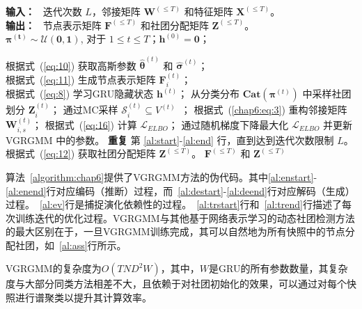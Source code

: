 \begin{algorithm}[h]
	\caption{VGRGMM的迭代算法} %
	\begin{algorithmic}[1]
		\STATE \textbf{输入：} ~迭代次数 $L$，邻接矩阵 $\mathbf{W}^{(\le T)}$ 和特征矩阵 $\mathbf{X}^{(\le T)}$。\\
		\STATE \textbf{输出：} ~节点表示矩阵 $\mathbf{F}^{(\le T)}$ 和社团分配矩阵 $\mathbf{Z}^{(\le T)}$。 \\
		 $\bm{\pi^{(t)}} \sim \bm{\mathcal{U}(0,1)}$, 对于 $1 \le t \le T$；$ \mathbf{h}^{(0)}=\mathbf{0}$；
		 \label{al:start}
		
		\STATE 根据式~(\ref{eq:10}) 获取高斯参数 $\hat{\mathbf{\theta}}^{(t)}$ 和 $\hat{\mathbf{\sigma}}^{(t)}$； \label{al:enstart} \\
		\STATE 根据式~(\ref{eq:11}) 生成节点表示矩阵 $\mathbf{F}_i^{(t)}$； \label{al:enend} \\
		\STATE 根据式~(\ref{eq:8}) 学习GRU隐藏状态 $\mathbf{h}^{(t)}$； \label{al:ev}
		   \label{al:destart}
		\STATE 从分类分布 $\boldsymbol{Cat}(\bm{\pi}^{(t)})$ 中采样社团划分 $\mathbf{Z}_i^{(t)}$；
		\STATE 通过MC采样 $\mathcal{S}_i^{(t)} \subseteq V^{(t)}$~\cite{jiang2024incomplete}；
		\STATE 根据式~(\ref{chap6:eq:3}) 重构邻接矩阵 $\mathbf{W}_{i,s}^{(t)}$；
		\ENDFOR
		\ENDFOR 
		\ENDFOR \label{al:deend}
		\STATE 根据式~(\ref{eq:16}) 计算 $\mathcal{L}_{ELBO}$； \label{al:trstart}
		\STATE 通过随机梯度下降最大化 $\mathcal{L}_{ELBO}$ 并更新 VGRGMM 中的参数。\label{al:end} \label{al:trend}
		\STATE \textbf{重复} 第 \ref{al:start}-\ref{al:end} 行，直到达到迭代次数限制 $L$。
		\STATE 根据式~(\ref{eq:12}) 获取社团分配矩阵 $\mathbf{Z}^{(\le T)}$。 \label{al:ass}
		\RETURN $\mathbf{F}^{(\le T)}$ 和 $\mathbf{Z}^{(\le T)}$
		
	\end{algorithmic}
	\label{algorithm:chap6}
\end{algorithm}
算法~\ref{algorithm:chap6}提供了VGRGMM方法的伪代码。其中\ref{al:enstart}-\ref{al:enend}行对应编码（推断）过程，而~\ref{al:destart}-\ref{al:deend}行对应解码（生成）过程。~\ref{al:ev}行是捕捉演化依赖性的过程。~\ref{al:trstart}行和~\ref{al:trend}行描述了每次训练迭代的优化过程。VGRGMM与其他基于网络表示学习的动态社团检测方法的最大区别在于，一旦VGRGMM训练完成，其可以自然地为所有快照中的节点分配社团，如~\ref{al:ass}行所示。




VGRGMM的复杂度为$O(TND^2W)$，其中，$W$是GRU的所有参数数量，其复杂度与大部分同类方法相差不大，且依赖于对社团初始化的效果，可以通过对每个快照进行谱聚类以提升其计算效率。

